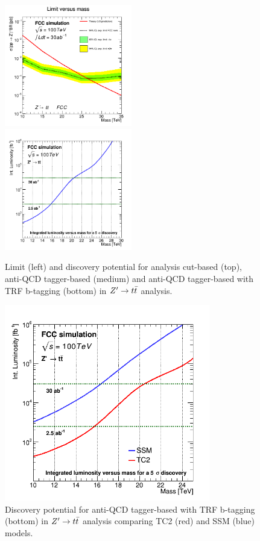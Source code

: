 \documentclass{cernrep}
\begin{document}
\begin{figure}[!htb]
\includegraphics[width=0.495\textwidth]{Fig/Zptt/tagger/lim_Zprime_tt_fcc_v02_TRFtag.png}
\includegraphics[width=0.495\textwidth]{Fig/Zptt/tagger/DiscoveryPotential_tt_TC2_rootStyle_TRFtag.png}
\caption{Limit (left) and discovery potential for analysis cut-based (top), anti-QCD tagger-based (medium) and anti-QCD tagger-based with TRF b-tagging (bottom) in $Z^{\prime} \rightarrow t\bar{t}$ analysis.}
\label{fig:Zptt_limit}
\end{figure}


\begin{figure}[!htb]\centering
\includegraphics[width=0.8\textwidth]{Fig/Zptt/tagger/DiscoveryPotential_tt_SSM_TC2_rootStyle_TRFtag.png}
\caption{Discovery potential for anti-QCD tagger-based with TRF b-tagging (bottom) in $Z^{\prime} \rightarrow t\bar{t}$ analysis comparing TC2 (red) and SSM (blue) models.}
\label{fig:Zptt_limit_TC2_SSM}
\end{figure}
\end{document}

